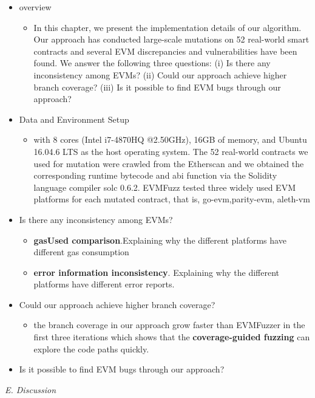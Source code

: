 \documentclass[a4paper]{article}
\begin{document}
	\begin{itemize}
		\item overview
		\begin{itemize}
			\item In this chapter, we present the implementation details of our algorithm. Our approach has conducted large-scale mutations on 52 real-world smart contracts and several EVM discrepancies and vulnerabilities have been found. We answer the following three questions: (i) Is there any
			inconsistency among EVMs? (ii) Could our approach achieve higher
			branch coverage? (iii) Is it possible to
			find EVM bugs through our approach?
		\end{itemize}
		\item Data and Environment Setup
		\begin{itemize}
			\item with 8 cores (Intel
			i7-4870HQ @2.50GHz), 16GB of memory, and Ubuntu 16.04.6 LTS as the
			host operating system. The 52 real-world contracts we used
			for mutation were crawled from the Etherscan and we obtained the corresponding runtime bytecode and abi function via the Solidity
			language compiler solc 0.6.2. EVMFuzz tested three widely
			used EVM platforms for each mutated contract, that is, go-evm,parity-evm, aleth-vm
		\end{itemize}
		\item Is there any
		inconsistency among EVMs?
		\begin{itemize}
			\item \textbf{gasUsed comparison}.Explaining why the different platforms have different gas consumption
			\item \textbf{error information inconsistency}. Explaining why the different platforms have different error reports.
		\end{itemize} 
		\item Could our approach achieve higher
		branch coverage?
		\begin{itemize}
			\item the branch coverage in our approach grow faster than EVMFuzzer in the first three iterations which shows that the \textbf{coverage-guided fuzzing} can explore the code paths quickly.
		\end{itemize}
		\item Is it possible to
		find EVM bugs through our approach?
	\end{itemize}
	\textit{E. Discussion}
\end{document}
